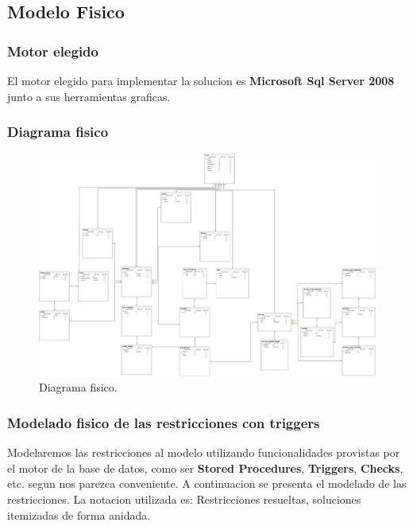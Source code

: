\subsection{Modelo Fisico}
\subsubsection{Motor elegido}
El motor elegido para implementar la solucion es \textbf{Microsoft Sql Server 2008} junto a sus herramientas graficas.

\subsubsection{Diagrama fisico}
\begin{landscape}
	\begin{figure}[t]
	  \centering
		\includegraphics[scale=0.35]{fig/modelo-fisico.png}
	  \caption{Diagrama fisico.}
	\end{figure}
\end{landscape}

\subsubsection{Modelado fisico de las restricciones con triggers}
Modelaremos las restricciones al modelo utilizando funcionalidades provistas por el motor de la base de datos, como ser \textbf{Stored Procedures}, \textbf{Triggers}, \textbf{Checks}, etc. segun nos parezca conveniente. A continuacion se presenta el modelado de las restricciones. La notacion utilizada es: Restricciones resueltas, soluciones itemizadas de forma anidada. 

